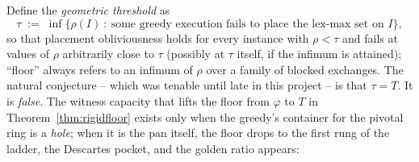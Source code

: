 \documentclass[11pt]{article}
\theoremstyle{definition}
\begin{document}
Define the \emph{geometric threshold} as
\[
\tau\;:=\;\inf\bigl\{\rho(I)\ :\ \text{some greedy execution fails to
place the lex-max set on }I\bigr\},
\]
so that placement obliviousness holds for every instance with
$\rho<\tau$ and fails at values of $\rho$ arbitrarily close to $\tau$
(possibly at $\tau$ itself, if the infimum is attained); ``floor''
always refers to an infimum of $\rho$ over a family of blocked
exchanges. The
natural conjecture -- which was tenable until late in this
project -- is that $\tau=T$. It is \emph{false}. The witness capacity that lifts the floor from $\varphi$ to
$T$ in Theorem~\ref{thm:rigidfloor} exists only when the greedy's
container for the pivotal ring is a \emph{hole}; when it is the pan
itself, the floor drops to the first rung of the ladder, the Descartes
pocket, and the golden ratio appears:
\end{document}

